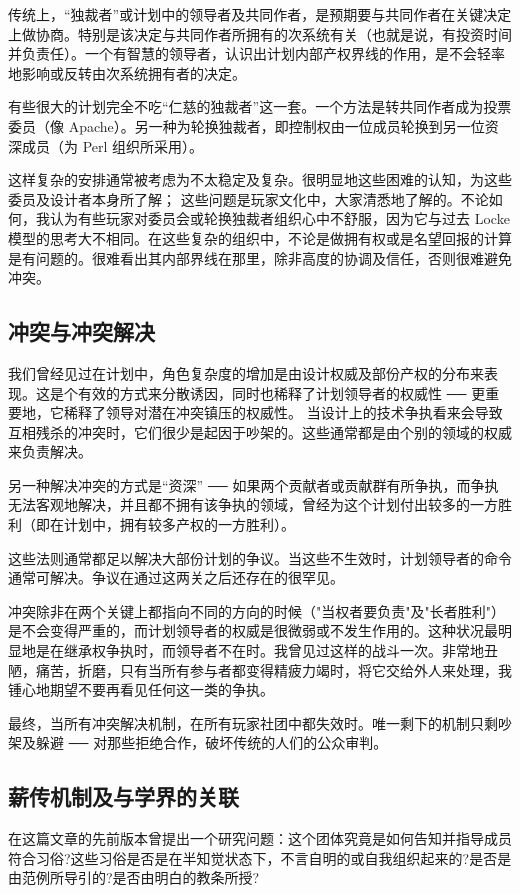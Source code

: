 传统上，“独裁者”或计划中的领导者及共同作者，是预期要与共同作者在关键决定上做协商。特别是该决定与共同作者所拥有的次系统有关（也就是说，有投资时间并负责任）。一个有智慧的领导者，认识出计划内部产权界线的作用，是不会轻率地影响或反转由次系统拥有者的决定。

有些很大的计划完全不吃“仁慈的独裁者”这一套。一个方法是转共同作者成为投票委员（像 Apache）。另一种为轮换独裁者，即控制权由一位成员轮换到另一位资深成员（为 Perl 组织所采用）。

这样复杂的安排通常被考虑为不太稳定及复杂。很明显地这些困难的认知，为这些委员及设计者本身所了解； 这些问题是玩家文化中，大家清悉地了解的。不论如何，我认为有些玩家对委员会或轮换独裁者组织心中不舒服，因为它与过去 Locke 模型的思考大不相同。在这些复杂的组织中，不论是做拥有权或是名望回报的计算是有问题的。很难看出其内部界线在那里，除非高度的协调及信任，否则很难避免冲突。

\subsection{冲突与冲突解决}
我们曾经见过在计划中，角色复杂度的增加是由设计权威及部份产权的分布来表现。这是个有效的方式来分散诱因，同时也稀释了计划领导者的权威性  ──  更重要地，它稀释了领导对潜在冲突镇压的权威性。
当设计上的技术争执看来会导致互相残杀的冲突时，它们很少是起因于吵架的。这些通常都是由个别的领域的权威来负责解决。

另一种解决冲突的方式是“资深”  ──  如果两个贡献者或贡献群有所争执，而争执无法客观地解决，并且都不拥有该争执的领域，曾经为这个计划付出较多的一方胜利（即在计划中，拥有较多产权的一方胜利）。

这些法则通常都足以解决大部份计划的争议。当这些不生效时，计划领导者的命令通常可解决。争议在通过这两关之后还存在的很罕见。

冲突除非在两个关键上都指向不同的方向的时候（"当权者要负责"及"长者胜利"）是不会变得严重的，而计划领导者的权威是很微弱或不发生作用的。这种状况最明显地是在继承权争执时，而领导者不在时。我曾见过这样的战斗一次。非常地丑陋，痛苦，折磨，只有当所有参与者都变得精疲力竭时，将它交给外人来处理，我锺心地期望不要再看见任何这一类的争执。

最终，当所有冲突解决机制，在所有玩家社团中都失效时。唯一剩下的机制只剩吵架及躲避  ──  对那些拒绝合作，破坏传统的人们的公众审判。


\subsection{薪传机制及与学界的关联}
在这篇文章的先前版本曾提出一个研究问题：这个团体究竟是如何告知并指导成员符合习俗?这些习俗是否是在半知觉状态下，不言自明的或自我组织起来的?是否是由范例所导引的?是否由明白的教条所授?

